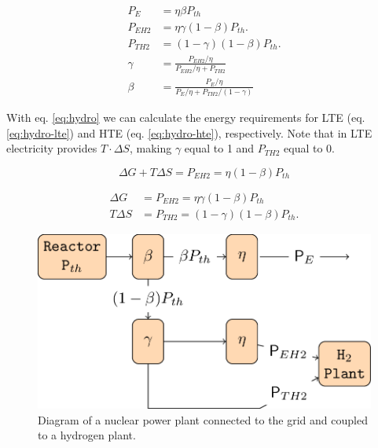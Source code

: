 \documentclass{anstrans}
\begin{document}
\begin{equation}
\begin{split}
P_{E} &= \eta \beta P_{th}
\\
P_{EH2} &= \eta \gamma (1-\beta) P_{th}.
\\
P_{TH2} &= (1-\gamma) (1-\beta) P_{th}.
\\
\gamma &= \frac{P_{EH2} / \eta}{P_{EH2} / \eta + P_{TH2}}
\\
\beta &= \frac{P_{E} / \eta}{P_{E} / \eta + P_{TH2}/(1-\gamma)}
\end{split}
\label{eq:hydro}
\end{equation}

With eq. \ref{eq:hydro} we can calculate the energy requirements for \gls{LTE} (eq. \ref{eq:hydro-lte}) and \gls{HTE} (eq. \ref{eq:hydro-hte}), respectively. Note that in \gls{LTE} electricity provides $T \cdot \Delta S$, making $\gamma$ equal to 1 and $P_{TH2}$ equal to 0.

\begin{equation}
\Delta G + T\Delta S = P_{EH2} = \eta (1-\beta) P_{th}
\label{eq:hydro-lte}
\end{equation}

\begin{equation}
\begin{split}
\Delta G &= P_{EH2} = \eta \gamma (1-\beta) P_{th}
\\
T\Delta S &= P_{TH2} = (1-\gamma) (1-\beta) P_{th}.
\end{split}
\label{eq:hydro-hte}
\end{equation}

\begin{figure}[H]
	\centering
	\includegraphics[width=1.0\linewidth]{figures/hte-figure0.png}
	\hfill
	\caption{Diagram of a nuclear power plant connected to the grid and coupled to a hydrogen plant.}
	\label{fig:h2diag}
\end{figure}
\end{document}
